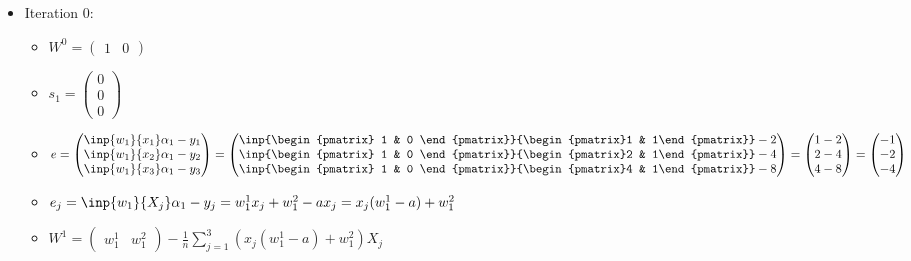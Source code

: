 \begin{itemize}
	\item Iteration 0:
	\begin{itemize}
		\item $W^0 = \begin{pmatrix} 1 & 0\end{pmatrix} $
		\item $s_1 = \begin{pmatrix} 0 \\ 0 \\ 0 \end{pmatrix} $
		\item $e = \begin{pmatrix} \inp{w_1}{x_1} \alpha_1 - y_1 \\ \inp{w_1}{x_2} \alpha_1 - y_2\\ \inp{w_1}{x_3} \alpha_1 - y_3 \end{pmatrix} =
			\begin{pmatrix}  \inp{\begin{pmatrix} 1 & 0 \end{pmatrix}}{\begin{pmatrix}1 & 1\end{pmatrix}} - 2 \\ \inp{\begin{pmatrix} 1 & 0 \end{pmatrix}}{\begin{pmatrix}2 & 1\end{pmatrix}} - 4\\ \inp{\begin{pmatrix} 1 & 0 \end{pmatrix}}{\begin{pmatrix}4 & 1\end{pmatrix}} - 8\end{pmatrix} =
			\begin{pmatrix}1-2 \\ 2-4 \\ 4-8  \end{pmatrix} = \begin{pmatrix} -1 \\ -2 \\ -4 \end{pmatrix} $
		\item $e_j = \inp{w_1}{X_j} \alpha_1 - y_j =  w_1^1 x_j + w_1^2 - a x_j = x_j (w_1^1 - a) + w_1^2$
		\item $W^1 = \begin{pmatrix} w^1_1 & w^2_1 \end{pmatrix}  - \frac{1}{n} \sum_{j=1}^{3} (x_j(w^1_1 - a) + w_1^2) X_j$

\end{itemize}
\end{itemize}
